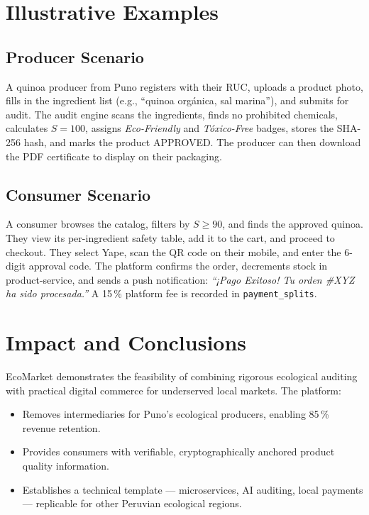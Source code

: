 \documentclass[10pt,a4paper,twocolumn]{article}
\begin{document}
\section{Illustrative Examples}

\subsection{Producer Scenario}

A quinoa producer from Puno registers with their RUC, uploads a product
photo, fills in the ingredient list (e.g., ``quinoa orgánica, sal marina''),
and submits for audit. The audit engine scans the ingredients, finds no
prohibited chemicals, calculates $S = 100$, assigns
\textit{Eco-Friendly} and \textit{Tóxico-Free} badges, stores the
SHA-256 hash, and marks the product APPROVED. The producer can then
download the PDF certificate to display on their packaging.

\subsection{Consumer Scenario}

A consumer browses the catalog, filters by $S \geq 90$, and finds the
approved quinoa. They view its per-ingredient safety table, add it to
the cart, and proceed to checkout. They select Yape, scan the QR code
on their mobile, and enter the 6-digit approval code. The platform
confirms the order, decrements stock in product-service, and sends
a push notification: \textit{``¡Pago Exitoso! Tu orden \#XYZ ha sido
procesada.''} A 15\,\% platform fee is recorded in
\texttt{payment\_splits}.

\section{Impact and Conclusions}

EcoMarket demonstrates the feasibility of combining rigorous
ecological auditing with practical digital commerce for underserved
local markets. The platform:

\begin{itemize}[leftmargin=1.2em, itemsep=2pt]
  \item Removes intermediaries for Puno's ecological producers,
    enabling 85\,\% revenue retention.
  \item Provides consumers with verifiable, cryptographically
    anchored product quality information.
  \item Establishes a technical template — microservices, AI
    auditing, local payments — replicable for other
    Peruvian ecological regions.
\end{itemize}
\end{document}
